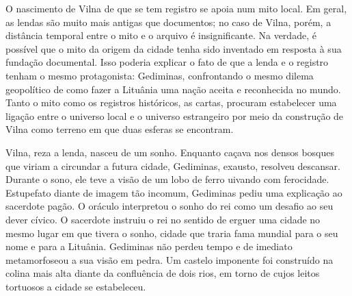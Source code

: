 \asterisc

O nascimento de Vilna de que se tem registro se apoia num mito local. Em
geral, as lendas são muito mais antigas que documentos; no caso de
Vilna, porém, a distância temporal entre o mito e o arquivo é
insignificante. Na verdade, é possível que o mito da origem da cidade
tenha sido inventado em resposta à sua fundação documental. Isso poderia
explicar o fato de que a lenda e o registro tenham o mesmo protagonista:
Gediminas, confrontando o mesmo dilema geopolítico de como fazer a
Lituânia uma nação aceita e reconhecida no mundo. Tanto o mito como os
registros históricos, as cartas, procuram estabelecer uma ligação
entre o universo local e o universo estrangeiro por meio da construção
de Vilna como terreno em que duas esferas se encontram.

Vilna, reza a lenda, nasceu de um sonho. Enquanto caçava nos densos
bosques que viriam a circundar a futura cidade, Gediminas, exausto,
resolveu descansar. Durante o sono, ele teve a visão de um lobo de ferro
uivando com ferocidade. Estupefato diante de imagem tão incomum,
Gediminas pediu uma explicação ao sacerdote pagão. O oráculo interpretou
o sonho do rei como um desafio ao seu dever cívico. O sacerdote instruiu
o rei no sentido de erguer uma cidade no mesmo lugar em que tivera o
sonho, cidade que traria fama mundial para o seu nome e para a Lituânia.
Gediminas não perdeu tempo e de imediato metamorfoseou a sua visão em
pedra. Um castelo imponente foi construído na colina mais alta diante da
confluência de dois rios, em torno de cujos leitos tortuosos a cidade se
estabeleceu.

